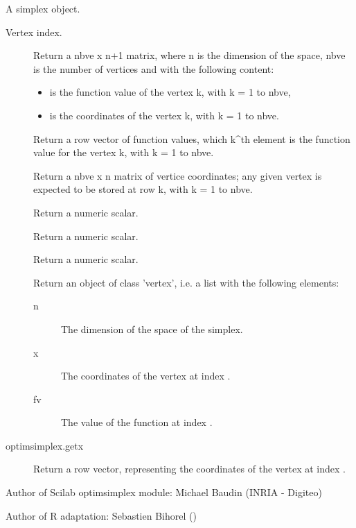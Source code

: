 %
\begin{Arguments}
\begin{ldescription}
\item[\code{this}] A simplex object.
\item[\code{ive}] Vertex index.
\end{ldescription}
\end{Arguments}
%
\begin{Value}
\begin{description}

\item[] Return a nbve x n+1 matrix, where n is the
dimension of the space, nbve is the number of vertices and with the
following content: \begin{itemize}

\item {} is the function value of the vertex k, with k =
1 to nbve,
\item {} is the coordinates of the vertex k, with
k = 1 to nbve.

\end{itemize}


\item[] Return a row vector of function values,
which k\textasciicircum{}th element is the function value for the vertex k, with k = 1 to
nbve.
\item[] Return a nbve x n matrix of vertice
coordinates; any given vertex is expected to be stored at row k, with k =
1 to nbve.
\item[] Return a numeric scalar.
\item[] Return a numeric scalar.
\item[] Return a numeric scalar.
\item[] Return an object of class 'vertex', i.e. a
list with the following elements: \begin{description}

\item[n] The dimension of the space of the simplex.
\item[x] The coordinates of the vertex at index .
\item[fv] The value of the function at index .

\end{description}


\item[optimsimplex.getx] Return a row vector, representing the coordinates
of the vertex at index .


\end{description}

\end{Value}
%
\begin{Author}\relax
Author of Scilab optimsimplex module: Michael Baudin (INRIA - Digiteo)

Author of R adaptation: Sebastien Bihorel ()
\end{Author}
%
\begin{SeeAlso}\relax
{}
\end{SeeAlso}
